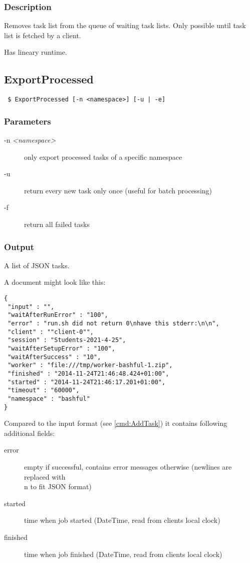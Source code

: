 \documentclass[a4paper,11pt]{article}
\begin{document}
\subsubsection{Description}
Removes task list from the queue of waiting task lists. Only possible until task list is fetched by a client.

Has lineary runtime.

\newpage


\subsection{ExportProcessed\label{cmd:ExportProcessed}}
\begin{verbatim}
 $ ExportProcessed [-n <namespace>] [-u | -e]
\end{verbatim}

\subsubsection{Parameters}
\begin{description}
\item[-n \textit{<namespace>}] only export processed tasks of a specific namespace
\item[-u] return every new task only once (useful for batch processing)
\item[-f] return all failed tasks
\end{description}

\subsubsection{Output}
A list of JSON tasks.

A document might look like this:

\begin{verbatim}
{
 "input" : "",
 "waitAfterRunError" : "100",
 "error" : "run.sh did not return 0\nhave this stderr:\n\n",
 "client" : ""client-0"",
 "session" : "Students-2021-4-25",
 "waitAfterSetupError" : "100",
 "waitAfterSuccess" : "10",
 "worker" : "file:///tmp/worker-bashful-1.zip",
 "finished" : "2014-11-24T21:46:48.424+01:00",
 "started" : "2014-11-24T21:46:17.201+01:00",
 "timeout" : "60000",
 "namespace" : "bashful"
}
\end{verbatim}

Compared to the input format (see \ref{cmd:AddTask}) it contains following additional fields:
\begin{description}
\item[error] empty if successful, contains error messages otherwise (newlines are replaced with \\n to fit JSON format)
\item[started] time when job started (DateTime, read from clients local clock)
\item[finished] time when job finished (DateTime, read from clients local clock)
\end{description}
\end{document}

